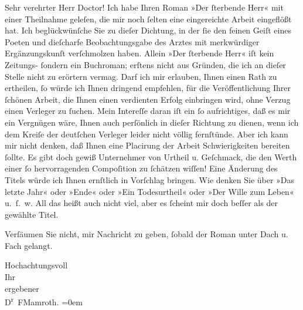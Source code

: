 \pstart{}Sehr verehrter Herr Doctor!\pend\vspace{0.5em}
\pstart
           Ich habe Ihren Roman »Der ſterbende Herr« mit
               einer Theilnahme geleſen, die mir noch ſelten eine eingereichte Arbeit eingeflößt
               hat. Ich beglückwünſche Sie zu dieſer Dichtung, in der ſie den feinen
               Geiſt eines Poeten und \introOben{}die\introOben{}{ }ſcharfe Beobachtungsgabe des Arztes mit
               merkwürdiger Ergänzungskunſt verſchmolzen haben. Allein »Der ſterbende Herr« iſt kein Zeitungs- ſondern ein Buchroman;
               erſtens nicht aus Gründen, die ich an dieſer Stelle nicht zu erörtern vermag. Darf
               ich mir erlauben, Ihnen einen Rath zu ertheilen, ſo würde ich Ihnen dringend
               empfehlen, für die Veröffentlichung Ihrer ſchönen Arbeit, die Ihnen einen verdienten
               Erfolg einbringen wird, ohne Verzug einen Verleger zu ſuchen. Mein Intereſſe daran
               iſt ein ſo aufrichtiges, daß es mir ein Vergnügen wäre, Ihnen auch perſönlich in
               dieſer Richtung zu dienen, wenn ich dem Kreiſe der deutſchen Verleger leider nicht
               völlig fernſtünde. Aber ich kann mir nicht denken, daß Ihnen eine Placirung der
               Arbeit Schwierigkeiten bereiten ſollte. Es gibt doch gewiß Unternehmer von Urtheil u.
               Geſchmack, die den Werth einer ſo hervorragenden Compoſition zu ſchätzen wiſſen! Eine
               Änderung des Titels würde ich Ihnen ernſtlich {\pb}in Vorſchlag bringen. Wie denken Sie über
               »Das letzte Jahr« oder »Ende« oder »Ein Todesurtheil« oder »Der Wille zum Leben«
               u. ſ. w. All das heißt auch nicht viel, aber es ſcheint mir doch beſſer als der
               gewählte Titel.\pend
           
\pstart
           Verſäumen Sie nicht, mir Nachricht zu geben, ſobald der Roman unter Dach u. Fach gelangt.\pend
           
\pstart
           Hochachtungsvoll{\\[\baselineskip]}Ihr{\\[\baselineskip]}ergebener{\\[\baselineskip]}\spacefill\mbox{D\textsuperscript{r} FMamroth.}\pend
           \leftskip=0em{}\endnumbering{}  
      